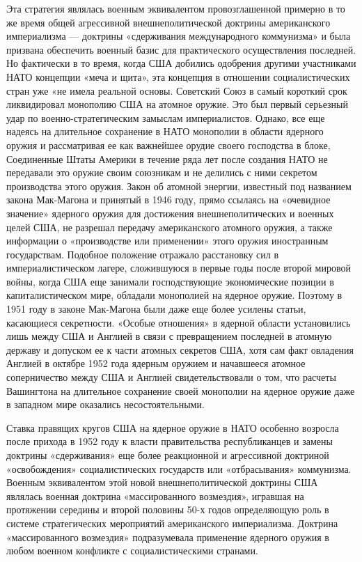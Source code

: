 \documentclass[12pt, a4paper, openany]{book}
\begin{document}
Эта стратегия являлась военным эквивалентом провозглашенной примерно в то же время общей агрессивной внешнеполитической доктрины американского империализма — доктрины «сдерживания международного коммунизма» и была призвана обеспечить военный базис для практического осуществления последней. Но фактически в то время, когда США добились одобрения другими участниками НАТО концепции «меча и щита», эта концепция в отношении социалистических стран уже «не имела реальной основы. Советский Союз в самый короткий срок ликвидировал монополию США на атомное оружие. Это был первый серьезный удар по военно-стратегическим замыслам империалистов. Однако, все еще надеясь на длительное сохранение в НАТО монополии в области ядерного оружия и рассматривая ее как важнейшее орудие своего господства в блоке, Соединенные Штаты Америки в течение ряда лет после создания НАТО не передавали это оружие своим союзникам и не делились с ними секретом производства этого оружия. Закон об атомной энергии, известный под названием закона Мак-Магона и принятый в 1946 году, прямо ссылаясь на «очевидное значение» ядерного оружия для достижения внешнеполитических и военных целей США, не разрешал передачу американского атомного оружия, а также информации о «производстве или применении» этого оружия иностранным государствам. Подобное положение отражало расстановку сил в империалистическом лагере, сложившуюся в первые годы после второй мировой войны, когда США еще занимали господствующие экономические позиции в капиталистическом мире, обладали монополией на ядерное оружие. Поэтому в 1951 году в законе Мак-Магона были даже еще более усилены статьи, касающиеся секретности. «Особые отношения» в ядерной области установились лишь между США и Англией в связи с превращением последней в атомную державу и допуском ее к части атомных секретов США, хотя сам факт овладения Англией в октябре 1952 года ядерным оружием и начавшееся атомное соперничество между США и Англией свидетельствовали о том, что расчеты Вашингтона на длительное сохранение своей монополии на ядерное оружие даже в западном мире оказались несостоятельными.
	
Ставка правящих кругов США на ядерное оружие в НАТО особенно возросла после прихода в 1952 году к власти правительства республиканцев и замены доктрины «сдерживания» еще более реакционной и агрессивной доктриной «освобождения» социалистических государств или «отбрасывания» коммунизма. Военным эквивалентом этой новой внешнеполитической доктрины США являлась военная доктрина «массированного возмездия», игравшая на протяжении середины и второй половины 50-х годов определяющую роль в системе стратегических мероприятий американского империализма. Доктрина «массированного возмездия» подразумевала применение ядерного оружия в любом военном конфликте с социалистическими странами.
	
\end{document}
